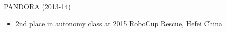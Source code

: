 \begin{frame}{\small PANDORA (2013-14)}

  \begin{itemize}
    \item 2nd place in autonomy class at 2015 RoboCup Rescue, Hefei China
  \end{itemize}

\end{frame}
